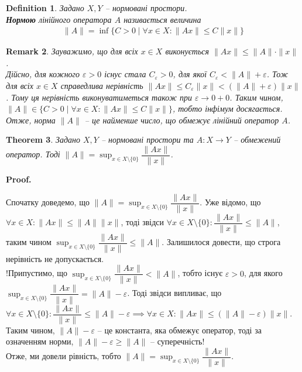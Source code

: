 \documentclass[a4paper, 10pt]{article}
\makeatletter
\theoremstyle{theoremdd}
\newtheorem{theorem}{Theorem}[subsection]
\theoremstyle{theoremdd}
\newtheorem{definition}[theorem]{Definition}
\theoremstyle{theoremdd}
\theoremstyle{theoremdd}
\theoremstyle{theoremdd}
\theoremstyle{theoremdd}
\newtheorem{remark}[theorem]{Remark}
\theoremstyle{theoremdd}
\theoremstyle{theoremdd}
\renewenvironment{proof}[1][Proof.\\]{\par
\pushQED{\hfill \qed}%
\normalfont \topsep6\p@\@plus6\p@\relax
\trivlist
\item\relax
{\bfseries
#1\@addpunct{.}}\hspace\labelsep\ignorespaces
}{%
\popQED\endtrivlist\@endpefalse
}
\makeatother
\begin{document}
\begin{definition}
Задано $X,Y$ -- нормовані простори.\\
\textbf{Нормою} лінійного оператора $A$ називається величина
\begin{align*}
 \| A\| = \inf \{C > 0 \mid \forall x \in X: \| Ax \| \leq C \|x\|\}
\end{align*}
\end{definition}

\begin{remark}
Зауважимо, що для всіх $x \in X$ виконується $\|Ax\| \leq \|A\| \cdot \|x\|$.\\
Дійсно, для кожного $\varepsilon > 0$ існус стала $C_\varepsilon > 0$, для якої $C_\varepsilon < \|A\| + \varepsilon$. Тож для всіх $x \in X$ справедлива нерівність $\|A x\| \leq C_\varepsilon \|x\| < (\| A \| + \varepsilon) \|x\|$. Тому ця нерівність виконуватиметься також при $\varepsilon \to 0+0$. Таким чином, $\|A\| \in \{C > 0 \mid \forall x \in X: \|Ax\| \leq C \|x\|\}$, тобто інфімум досягається. \\
Отже, норма $\|A\|$ -- це найменше число, що обмежує лінійний оператор $A$.
\end{remark}

\begin{theorem}
Задано $X,Y$ -- нормовані простори та $A \colon X \to Y$ -- обмежений оператор. Тоді $\displaystyle\|A\| = \sup_{x \in X \setminus \{0\}} \dfrac{\| Ax\|}{\|x\|}$.
\end{theorem}

\begin{proof}
Спочатку доведемо, що $\|A\| = \displaystyle\sup_{x \in X \setminus \{0\}} \dfrac{\| Ax\|}{\|x\|}$. Уже відомо, що $\forall x \in X: \|Ax \| \leq \|A \| \|x\|$, тоді звідси $\forall x \in X \setminus \{0\}: \dfrac{\|Ax\|}{\|x\|} \leq \|A\|$, таким чином $\displaystyle\sup_{x \in X \setminus \{0\}} \dfrac{\|Ax\|}{\|x\|} \leq \|A\|$. Залишилося довести, що строга нерівність не допускається.\\
!Припустимо, що $\displaystyle\sup_{x \in X \setminus \{0\}} \dfrac{\|Ax\|}{\|x\|} < \|A\|$, тобто існує $\varepsilon > 0$, для якого $\displaystyle\sup_{x \in X \setminus \{0\}} \dfrac{\|Ax\|}{\|x\|} = \|A\|- \varepsilon$. Тоді звідси випливає, що $\forall x \in X \setminus \{0\}: \dfrac{\|Ax\| }{\|x\|} \leq \|A\| - \varepsilon \implies \forall x \in X: \|Ax\| \leq (\|A\|-\varepsilon) \|x\|$. Таким чином, $\|A\|-\varepsilon$ -- це константа, яка обмежує оператор, тоді за означенням норми, $\|A\| - \varepsilon \geq \|A\|$ -- суперечність!\\
Отже, ми довели рівність, тобто $\|A\| = \displaystyle\sup_{x \in X \setminus \{0\}} \dfrac{\| Ax\|}{\|x\|}$.
\end{proof}
\end{document}
